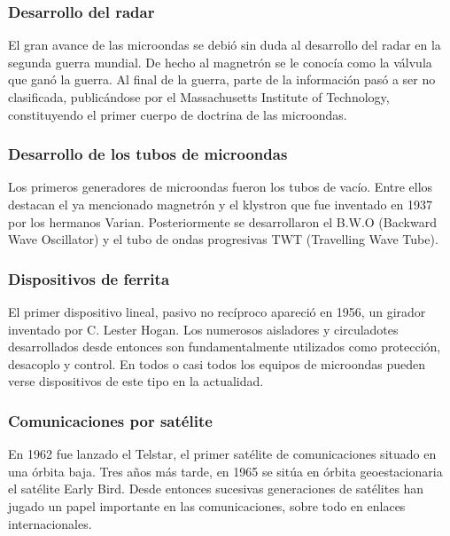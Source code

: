\documentclass[12pt]{article}
\begin{document}
\subsubsection{Desarrollo del radar}
El gran avance de las microondas se debi\'o sin duda al desarrollo del radar en la segunda guerra mundial. De hecho al magnetr\'on se le conoc\'ia como la v\'alvula que gan\'o la guerra. Al final de la guerra, parte de la informaci\'on pas\'o a ser no clasificada, public\'andose por el Massachusetts Institute of Technology, constituyendo el primer cuerpo de doctrina de las microondas.
\subsubsection{Desarrollo de los tubos de microondas}
Los primeros generadores de microondas fueron los tubos de vac\'io. Entre ellos destacan el ya mencionado magnetr\'on y el klystron que fue inventado en 1937 por los hermanos Varian. Posteriormente se desarrollaron el B.W.O (Backward Wave Oscillator) y el tubo de ondas progresivas TWT (Travelling Wave Tube).
\subsubsection{Dispositivos de ferrita}
El primer dispositivo lineal, pasivo no rec\'iproco apareci\'o en 1956, un girador inventado por C. Lester Hogan. Los numerosos aisladores y circuladotes desarrollados desde entonces son fundamentalmente utilizados como protecci\'on, desacoplo y control. En todos o casi todos los equipos de microondas pueden verse dispositivos de este tipo en la actualidad.

\subsubsection{Comunicaciones por sat\'elite}
En 1962 fue lanzado el Telstar, el primer sat\'elite de comunicaciones situado en una \'orbita baja. Tres a\~nos m\'as tarde, en 1965 se sit\'ua en \'orbita geoestacionaria el sat\'elite Early Bird. Desde entonces sucesivas generaciones de sat\'elites han jugado un papel importante en las comunicaciones, sobre todo en enlaces internacionales.
\end{document}
